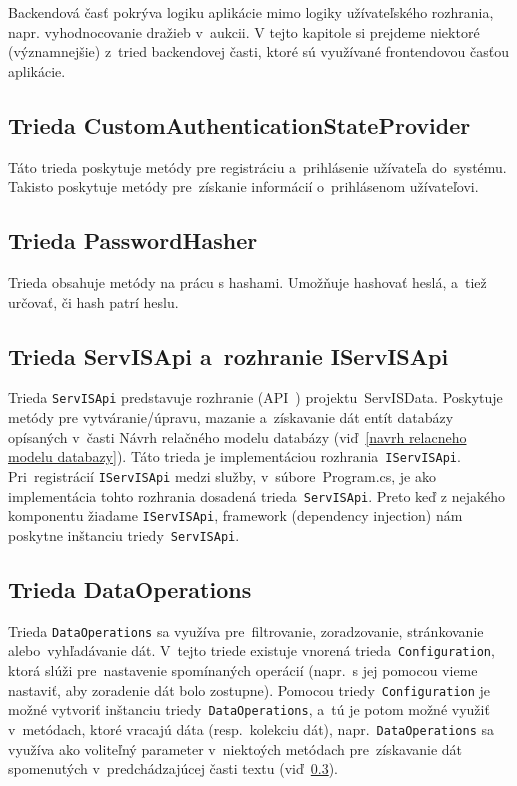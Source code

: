 Backendová časť pokrýva logiku aplikácie mimo logiky užívateľského rozhrania, napr. vyhodnocovanie dražieb v~aukcii. V tejto kapitole si prejdeme niektoré (významnejšie) z~tried backendovej časti, ktoré sú využívané frontendovou časťou aplikácie.

\subsection{Trieda CustomAuthenticationStateProvider}
\label{trieda customauthenticationstateprovider}

Táto trieda poskytuje metódy pre registráciu a~prihlásenie užívateľa do~systému. Takisto poskytuje metódy pre~získanie informácií o~prihlásenom užívateľovi.

\subsection{Trieda PasswordHasher}
\label{trieda passwordhasher}

Trieda obsahuje metódy na prácu s hashami. Umožňuje hashovať heslá, a~tiež určovať, či hash patrí heslu.

\subsection{Trieda ServISApi a~rozhranie IServISApi}
\label{trieda servisapi a rozhranie iservisapi}

Trieda \verb|ServISApi| predstavuje rozhranie (API~\cite{api}) projektu~ServISData. Poskytuje metódy pre vytváranie/úpravu, mazanie a~získavanie dát entít databázy opísaných v~časti Návrh relačného modelu databázy (viď~\ref{navrh relacneho modelu databazy}). Táto trieda je implementáciou rozhrania~\verb|IServISApi|. Pri~registrácií \verb|IServISApi| medzi služby, v~súbore~Program.cs, je ako implementácia tohto rozhrania dosadená trieda~\verb|ServISApi|. Preto keď z nejakého komponentu žiadame \verb|IServISApi|, framework (dependency injection) nám poskytne inštanciu triedy~\verb|ServISApi|.

\subsection{Trieda DataOperations}
\label{trieda dataoperations}

Trieda \verb|DataOperations| sa využíva pre~filtrovanie, zoradzovanie, stránkovanie alebo~vyhľadávanie dát. V~tejto triede existuje vnorená trieda~\verb|Configuration|, ktorá slúži pre~nastavenie spomínaných operácií (napr.~s jej pomocou vieme nastaviť, aby zoradenie dát bolo zostupne). Pomocou triedy~\verb|Configuration| je možné vytvoriť inštanciu triedy~\verb|DataOperations|, a~tú je potom možné využiť v~metódach, ktoré vracajú dáta (resp.~kolekciu dát), napr.~\verb|DataOperations| sa využíva ako voliteľný parameter v~niektoých metódach pre~získavanie dát spomenutých v~predchádzajúcej časti textu (viď~\ref{trieda servisapi a rozhranie iservisapi}).

